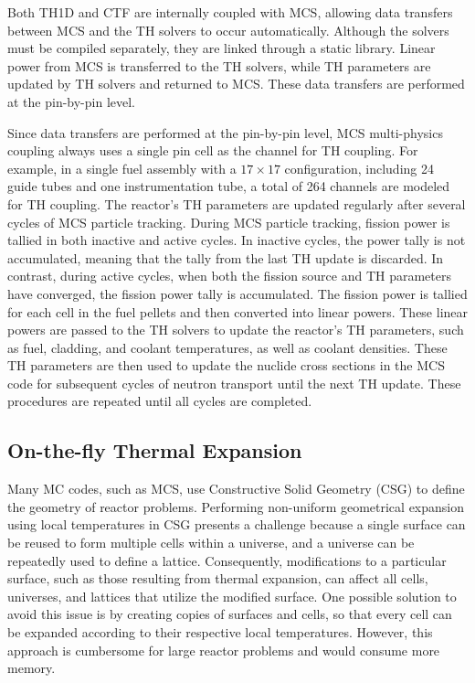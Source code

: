 Both TH1D and CTF are internally coupled with MCS, allowing data transfers between MCS and the TH solvers to occur automatically. Although the solvers must be compiled separately, they are linked through a static library. Linear power from MCS is transferred to the TH solvers, while TH parameters are updated by TH solvers and returned to MCS. These data transfers are performed at the pin-by-pin level.

Since data transfers are performed at the pin-by-pin level, MCS multi-physics coupling always uses a single pin cell as the channel for TH coupling. For example, in a single fuel assembly with a $17\times17$ configuration, including 24 guide tubes and one instrumentation tube, a total of 264 channels are modeled for TH coupling.
The reactor's TH parameters are updated regularly after several cycles of MCS particle tracking. During MCS particle tracking, fission power is tallied in both inactive and active cycles. In inactive cycles, the power tally is not accumulated, meaning that the tally from the last TH update is discarded. In contrast, during active cycles, when both the fission source and TH parameters have converged, the fission power tally is accumulated. The fission power is tallied for each cell in the fuel pellets and then converted into linear powers. These linear powers are passed to the TH solvers to update the reactor's TH parameters, such as fuel, cladding, and coolant temperatures, as well as coolant densities. These TH parameters are then used to update the nuclide cross sections in the MCS code for subsequent cycles of neutron transport until the next TH update. These procedures are repeated until all cycles are completed.


\subsection{On-the-fly Thermal Expansion} \label{sec33}

Many MC codes, such as MCS, use Constructive Solid Geometry (CSG) to define the geometry of reactor problems. Performing non-uniform geometrical expansion using local temperatures in CSG presents a challenge because a single surface can be reused to form multiple cells within a universe, and a universe can be repeatedly used to define a lattice. Consequently, modifications to a particular surface, such as those resulting from thermal expansion, can affect all cells, universes, and lattices that utilize the modified surface. One possible solution to avoid this issue is by creating copies of surfaces and cells, so that every cell can be expanded according to their respective local temperatures. However, this approach is cumbersome for large reactor problems and would consume more memory.

